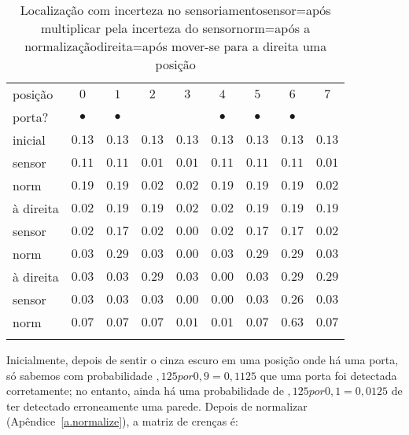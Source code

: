 \begin{table}
\caption[Localização com incerteza no sensoriamento]{Localização com incerteza no sensoriamento\newline{}sensor=após multiplicar pela incerteza do sensor\newline{}norm=após a normalização\newline{}direita=após mover-se para a direita uma posição}\label{tab.uncertain-sensing}
\setlength{\tabcolsep}{6pt}
\begin{tabular}{l|rrrrrrrr}
\hline\noalign{\smallskip}
posição&\multicolumn{1}{c}{$0$}&\multicolumn{1}{c}{$1$}&\multicolumn{1}{c}{$2$}&\multicolumn{1}{c}{$3$}&\multicolumn{1}{c}{$4$}&\multicolumn{1}{c}{$5$}&\multicolumn{1}{c}{$6$}&\multicolumn{1}{c}{$7$}\\
porta?&\multicolumn{1}{c}{$\bullet$}&\multicolumn{1}{c}{$\bullet$}&&&\multicolumn{1}{c}{$\bullet$}&\multicolumn{1}{c}{$\bullet$}&\multicolumn{1}{c}{$\bullet$}&\\
\hline\noalign{\smallskip}
inicial &$0.13$ & $0.13$ & $0.13$ & $0.13$ & $0.13$ & $0.13$ & $0.13$ & $0.13$\\
sensor  &$0.11$ & $0.11$ & $0.01$ & $0.01$ & $0.11$ & $0.11$ & $0.11$ & $0.01$\\
norm    &$0.19$ & $0.19$ & $0.02$ & $0.02$ & $0.19$ & $0.19$ & $0.19$ & $0.02$\\
\hline
à direita   &$0.02$ & $0.19$ & $0.19$ & $0.02$ & $0.02$ & $0.19$ & $0.19$ & $0.19$\\
sensor  &$0.02$ & $0.17$ & $0.02$ & $0.00$ & $0.02$ & $0.17$ & $0.17$ & $0.02$\\
norm    &$0.03$ & $0.29$ & $0.03$ & $0.00$ & $0.03$ & $0.29$ & $0.29$ & $0.03$\\
\hline
à direita   &$0.03$ & $0.03$ & $0.29$ & $0.03$ & $0.00$ & $0.03$ & $0.29$ & $0.29$\\
sensor  &$0.03$ & $0.03$ & $0.03$ & $0.00$ & $0.00$ & $0.03$ & $0.26$ & $0.03$\\
norm    &$0.07$ & $0.07$ & $0.07$ & $0.01$ & $0.01$ & $0.07$ & $0.63$ & $0.07$\\
\noalign{\smallskip}\hline\noalign{\smallskip}
\end{tabular}
\end{table}

Inicialmente, depois de sentir o cinza escuro em uma posição onde há uma porta, só sabemos com probabilidade $,125 por 0,9 = 0,1125$ que uma porta foi detectada corretamente; no entanto, ainda há uma probabilidade de $,125 por 0,1= 0,0125$ de ter detectado erroneamente uma parede. Depois de normalizar (Apêndice~\ref{a.normalize}), a matriz de crenças é:
\begin{center}
\end{center}

